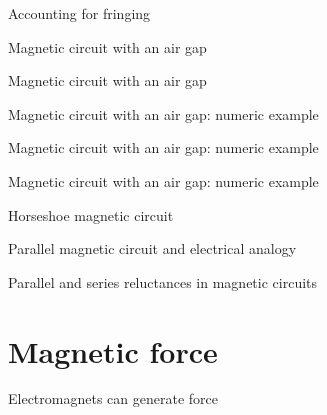 \documentclass[compress]{beamer}
\begin{document}
{
    \begin{frame}{Accounting for fringing}
    \end{frame}
}

{
    \begin{frame}{Magnetic circuit with an air gap}
    \end{frame}
}

{
    \begin{frame}{Magnetic circuit with an air gap}
    \end{frame}
}

{
    \begin{frame}{Magnetic circuit with an air gap: numeric example}
    \end{frame}
}

{
    \begin{frame}{Magnetic circuit with an air gap: numeric example}
    \end{frame}
}

{
    \begin{frame}{Magnetic circuit with an air gap: numeric example}
    \end{frame}
}

{
    \begin{frame}{Horseshoe magnetic circuit}
    \end{frame}
}

{
    \begin{frame}{Parallel magnetic circuit and electrical analogy}
    \end{frame}
}

{
    \begin{frame}{Parallel and series reluctances in magnetic circuits}
    \end{frame}
}

\section{Magnetic force}

{
    \begin{frame}{Electromagnets can generate force}
    \end{frame}
}
\end{document}
